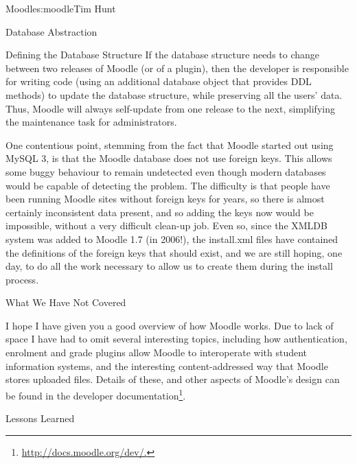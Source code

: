 \begin{aosachapter}{Moodle}{s:moodle}{Tim Hunt}
\begin{aosasect1}{Database Abstraction}
\begin{aosasect2}{Defining the Database Structure}
If the database structure needs to change between two releases of
Moodle (or of a plugin), then the developer is responsible for writing
code (using an additional database object that provides DDL methods)
to update the database structure, while preserving all the users'
data. Thus, Moodle will always self-update from one release to the
next, simplifying the maintenance task for administrators.

One contentious point, stemming from the fact that Moodle started out
using MySQL 3, is that the Moodle database does not use foreign
keys. This allows some buggy behaviour to remain undetected even
though modern databases would be capable of detecting the problem. The
difficulty is that people have been running Moodle sites without
foreign keys for years, so there is almost certainly inconsistent data
present, and so adding the keys now would be impossible, without a
very difficult clean-up job. Even so, since the XMLDB system was added
to Moodle 1.7 (in 2006!), the install.xml files have contained the
definitions of the foreign keys that should exist, and we are still
hoping, one day, to do all the work necessary to allow us to create
them during the install process.

\end{aosasect2}

\end{aosasect1}

\begin{aosasect1}{What We Have Not Covered}

I hope I have given you a good overview of how Moodle works. Due to
lack of space I have had to omit several interesting topics, including
how authentication, enrolment and grade plugins allow Moodle to
interoperate with student information systems, and the interesting
content-addressed way that Moodle stores uploaded files. Details of
these, and other aspects of Moodle's design can be found in the
developer documentation\footnote{\url{http://docs.moodle.org/dev/.}}.

\end{aosasect1}

\begin{aosasect1}{Lessons Learned}


\end{aosasect1}
\end{aosachapter}
